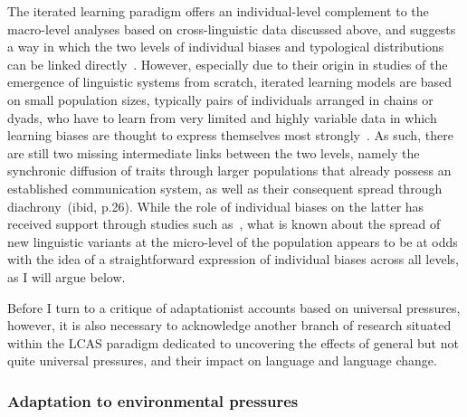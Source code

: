 

The iterated learning paradigm offers an individual-level complement to the macro-level analyses based on cross-linguistic data discussed above, and suggests a way in which the two levels of individual biases and typological distributions can be linked directly~\citep{Kirby1999,Kirby2008}. However, especially due to their origin in studies of the emergence of linguistic systems from scratch, iterated learning models are based on small population sizes, typically pairs of individuals arranged in chains or dyads, who have to learn from very limited and highly variable data in which learning biases are thought to express themselves most strongly~\citep{Fedzechkina2014}. As such, there are still two missing intermediate links between the two levels, namely the synchronic diffusion of traits through larger populations that already possess an established communication system, as well as their consequent spread through diachrony~(ibid, p.26). While the role of individual biases on the latter has received support through studies such as~\citet{Wedel2013short}, what is known about the spread of new linguistic variants at the micro-level of the population appears to be at odds with the idea of a straightforward expression of individual biases across all levels, as I will argue below.

Before I turn to a critique of adaptationist accounts based on universal pressures, however, it is also necessary to acknowledge another branch of research situated within the LCAS paradigm dedicated to uncovering the effects of general but not quite universal pressures, and their impact on language and language change.

\subsubsection{Adaptation to environmental pressures}

